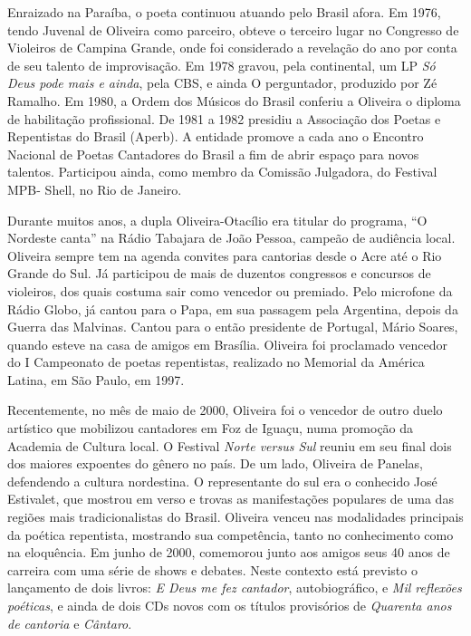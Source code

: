 Enraizado na Paraíba, o poeta continuou atuando pelo
Brasil afora. Em 1976, tendo Juvenal de Oliveira como
parceiro, obteve o terceiro lugar no Congresso de Violeiros
de Campina Grande, onde foi considerado a revelação do
ano por conta de seu talento de improvisação. Em 1978
gravou, pela continental, um LP \textit{Só Deus pode mais e ainda},
pela CBS, e ainda O perguntador, produzido por Zé
Ramalho. Em 1980, a Ordem dos Músicos do Brasil
conferiu a Oliveira o diploma de habilitação profissional.
De 1981 a 1982 presidiu a Associação dos Poetas e
Repentistas do Brasil (Aperb). A entidade promove a cada
ano o Encontro Nacional de Poetas Cantadores do Brasil a
fim de abrir espaço para novos talentos. Participou ainda,
como membro da Comissão Julgadora, do Festival MPB-
Shell, no Rio de Janeiro.

Durante muitos anos, a dupla Oliveira-Otacílio era
titular do programa, ``O Nordeste canta'' na
Rádio Tabajara
de João Pessoa, campeão de audiência local. Oliveira
sempre tem na agenda convites para cantorias desde o Acre
até o Rio Grande do Sul. Já participou de mais de duzentos
congressos e concursos de violeiros, dos quais costuma sair
como vencedor ou premiado. Pelo microfone da Rádio
Globo, já cantou para o Papa, em sua passagem pela
Argentina, depois da Guerra das Malvinas. Cantou para o
então presidente de Portugal, Mário Soares, quando esteve
na casa de amigos em Brasília. Oliveira foi proclamado
vencedor do I Campeonato de poetas repentistas, realizado
no Memorial da América Latina, em São Paulo, em 1997.

Recentemente, no mês de maio de 2000, Oliveira foi o
vencedor de outro duelo artístico que mobilizou cantadores
em Foz de Iguaçu, numa promoção da Academia de Cultura
local. O Festival \textit{Norte versus Sul} reuniu em seu final dois
dos maiores expoentes do gênero no país. De um lado,
Oliveira de Panelas, defendendo a cultura nordestina. O
representante do sul era o conhecido José Estivalet, que
mostrou em verso e trovas as manifestações populares de
uma das regiões mais tradicionalistas do Brasil. Oliveira
venceu nas modalidades principais da poética repentista,
mostrando sua competência, tanto no conhecimento como
na eloquência. Em junho de 2000, comemorou junto aos
amigos seus 40 anos de carreira com uma série de shows e
debates. Neste contexto está previsto o lançamento de dois
livros: \textit{E Deus me fez cantador}, autobiográfico, e \textit{Mil
reflexões poéticas}, e ainda de dois CDs novos com os títulos
provisórios de \textit{Quarenta anos de cantoria} e \textit{Cântaro}.

